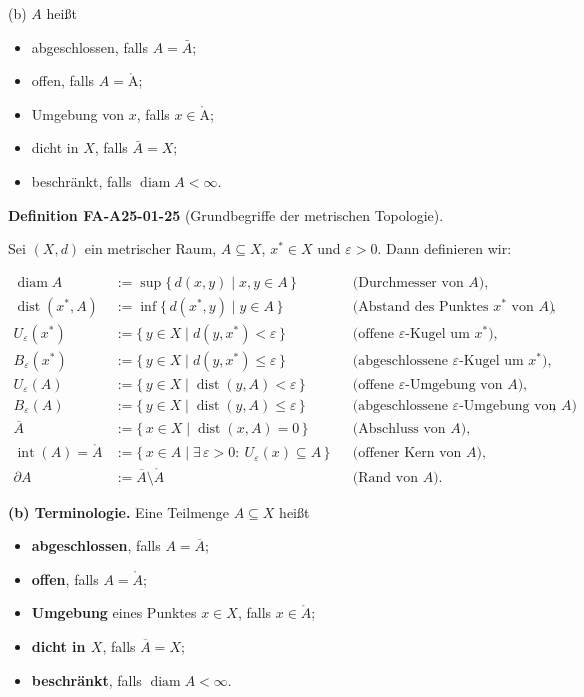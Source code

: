 \documentclass[10pt, letterpaper]{article}
\newcommand{\CustomHeading}[3]{%
  \par\medskip\noindent%
  \textbf{#1 #2} \textnormal{(#3)}.\enskip%
}
\newenvironment{DEF}[2]{\begin{unitbox}\CustomHeading{Definition}{#1}{#2}}{\end{unitbox}}
\def\AA{\mathring{\mathrm{A}}}
\begin{document}
(b) $A$ heißt

\begin{itemize}
  \item abgeschlossen, falls $A=\bar{A}$;
  \item offen, falls $A=\AA$;
  \item Umgebung von $x$, falls $x \in \AA$;
  \item dicht in $X$, falls $\bar{A}=X$;
  \item beschränkt, falls $\operatorname{diam} A<\infty$.
\end{itemize}



\begin{DEF}{FA-A25-01-25}{Grundbegriffe der metrischen Topologie}
Sei $(X,d)$ ein metrischer Raum, $A\subseteq X$, $x^{*}\in X$ und $\varepsilon>0$.  
Dann definieren wir:

\begin{align*}
\operatorname{diam}A
&:=\sup\{\,d(x,y)\mid x,y\in A\,\}
&&\text{(Durchmesser von $A$)},\\[0.5em]
\operatorname{dist}(x^{*},A)
&:=\inf\{\,d(x^{*},y)\mid y\in A\,\}
&&\text{(Abstand des Punktes $x^{*}$ von $A$)},\\[0.5em]
U_{\varepsilon}(x^{*})
&:=\{\,y\in X\mid d(y,x^{*})<\varepsilon\,\}
&&\text{(offene $\varepsilon$-Kugel um $x^{*}$)},\\[0.5em]
B_{\varepsilon}(x^{*})
&:=\{\,y\in X\mid d(y,x^{*})\le\varepsilon\,\}
&&\text{(abgeschlossene $\varepsilon$-Kugel um $x^{*}$)},\\[0.5em]
U_{\varepsilon}(A)
&:=\{\,y\in X\mid \operatorname{dist}(y,A)<\varepsilon\,\}
&&\text{(offene $\varepsilon$-Umgebung von $A$)},\\[0.5em]
B_{\varepsilon}(A)
&:=\{\,y\in X\mid \operatorname{dist}(y,A)\le\varepsilon\,\}
&&\text{(abgeschlossene $\varepsilon$-Umgebung von $A$)},\\[0.5em]
\overline{A}
&:=\{\,x\in X\mid \operatorname{dist}(x,A)=0\,\}
&&\text{(Abschluss von $A$)},\\[0.5em]
\operatorname{int}(A)=\mathring{A}
&:=\{\,x\in A\mid \exists\,\varepsilon>0:\ U_{\varepsilon}(x)\subseteq A\,\}
&&\text{(offener Kern von $A$)},\\[0.5em]
\partial A
&:=\overline{A}\setminus \mathring{A}
&&\text{(Rand von $A$)}.
\end{align*}

\textbf{(b) Terminologie.}  
Eine Teilmenge $A\subseteq X$ heißt
\begin{itemize}
  \item \textbf{abgeschlossen}, falls $A=\overline{A}$;
  \item \textbf{offen}, falls $A=\mathring{A}$;
  \item \textbf{Umgebung} eines Punktes $x\in X$, falls $x\in\mathring{A}$;
  \item \textbf{dicht in $X$}, falls $\overline{A}=X$;
  \item \textbf{beschränkt}, falls $\operatorname{diam}A<\infty$.
\end{itemize}
\end{DEF}
\end{document}
